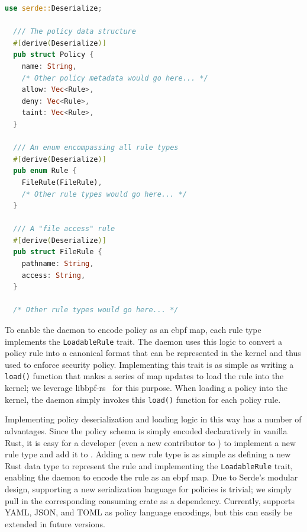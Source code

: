 \begin{lstlisting}[language=Rust, gobble=2, caption={[A simplified example of \bpfcontain{}'s policy deserialization logic]
  A simplified example of \bpfcontain{}'s policy deserialization logic. Policy rules are
  specified declaratively using Rust structs and the corresponding deserialization logic
  is automatically generated by the Serde crate, using a simple decorator macro.
},
label={lst:bpfcontain-serde}]
  use serde::Deserialize;

  /// The policy data structure
  #[derive(Deserialize)]
  pub struct Policy {
    name: String,
    /* Other policy metadata would go here... */
    allow: Vec<Rule>,
    deny: Vec<Rule>,
    taint: Vec<Rule>,
  }

  /// An enum encompassing all rule types
  #[derive(Deserialize)]
  pub enum Rule {
    FileRule(FileRule),
    /* Other rule types would go here... */
  }

  /// A "file access" rule
  #[derive(Deserialize)]
  pub struct FileRule {
    pathname: String,
    access: String,
  }

  /* Other rule types would go here... */
\end{lstlisting}

To enable the daemon to encode policy as an \gls{ebpf} map, each rule type implements the
\texttt{LoadableRule} trait. The daemon uses this logic to convert a policy rule into
a canonical format that can be represented in the kernel and thus used to enforce security
policy. Implementing this trait is as simple as writing a \texttt{load()} function that
makes a series of map updates to load the rule into the kernel; we leverage
libbpf-rs~\cite{libbpf-rs} for this purpose. When loading a policy into the kernel, the
daemon simply invokes this \texttt{load()} function for each policy rule.

Implementing policy deserialization and loading logic in this way has a number of
advantages. Since the policy schema is simply encoded declaratively in vanilla Rust, it is
easy for a developer (even a new contributor to \bpfcontain{}) to implement a new rule
type and add it to \bpfcontain{}. Adding a new rule type is as simple as defining a new
Rust data type to represent the rule and implementing the \texttt{LoadableRule} trait,
enabling the daemon to encode the rule as an \gls{ebpf} map. Due to Serde's modular
design, supporting a new serialization language for \bpfcontain{} policies is trivial; we
simply pull in the corresponding consuming crate as a dependency. Currently, \bpfcontain{}
supports YAML, JSON, and TOML as policy language encodings, but this can easily be
extended in future versions.

